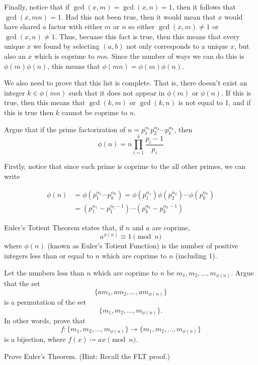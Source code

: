 \documentclass[11pt]{article}
\begin{document}
\begin{Parts}
\begin{solution}
      Finally, notice that if $\gcd(x, m) = \gcd(x, n) = 1$, then it follows that $\gcd(x, mn) = 1$. Had this not been true, then it would mean that $x$ would have shared a factor with either $m$ or $n$ so either $\gcd(x, m) \neq 1$ or $\gcd(x, n) \neq 1$. Thus, becuase this fact is true, then this means that every unique $x$ we found by selecting $(a, b)$ not only corresponds to a unique $x$, but also an $x$ which is coprime to $mn$. Since the number of ways we can do this is $\phi(m)\phi(n)$, this means that $\phi(mn) = \phi(m)\phi(n)$.

      We also need to prove that this list is complete. That is, there doesn't exist an integer $k \in \phi(mn)$ such that it does not appear in $\phi(m)$ or $\phi(n)$. If this is true, then this means that $\gcd(k, m)$ or $\gcd(k, n)$ is not equal to 1, and if this is true then $k$ cannot be coprime to $n$. 

    \end{solution}

    \Part Argue that if the prime factorization of $n = p_1^{\alpha_1} p_2^{\alpha_2} \cdots p_k^{\alpha_k}$, then
    \[ \phi(n) = n \prod_{i = 1}^k \frac{p_i - 1}{p_i} \]

    Firstly, notice that since each prime is coprime to the all other primes, we can write 
    \begin{solution}
    \begin{align*}
      \phi(n) &= \phi(p_1^{\alpha_1} \cdots p_k^{\alpha_k}) = \phi(p_1^{\alpha_1})\phi(p_2^{\alpha_2}) \cdots \phi(p_k^{\alpha_k})\\
      &= (p_1^{\alpha_1} - p_1^{\alpha_1 - 1}) \cdots (p_k^{\alpha_k} - p_k^{\alpha_k - 1})
    \end{align*}
  \end{solution}


  \end{Parts}


\pagebreak
{}Euler's Totient Theorem states that, if $n$ and $a$ are coprime,
\[
  a^{\phi(n)} \equiv 1 \pmod{n}
\]
where $\phi(n)$ (known as Euler's Totient Function) is the number of positive
integers less than or equal to $n$ which are coprime to $n$ (including 1).

\begin{Parts}
  \Part Let the numbers less than $n$ which are coprime to $n$ be $m_1, m_2, \ldots, m_{\phi(n)}$. 
  Argue that the set
  \[\{am_1, am_2, \ldots, am_{\phi(n)}\}\]
  is a permutation of the set
  \[\{m_1, m_2, \ldots, m_{\phi(n)}\}.\]
  In other words, prove that 
  \[f:\{m_1, m_2, \ldots, m_{\phi(n)}\} \to \{m_1, m_2, \ldots, m_{\phi(n)}\}\]
  is a bijection, where $f(x) \coloneqq ax \pmod{n}$.

  \Part Prove Euler's Theorem. (Hint: Recall the FLT proof.)


\end{Parts}
\end{document}
